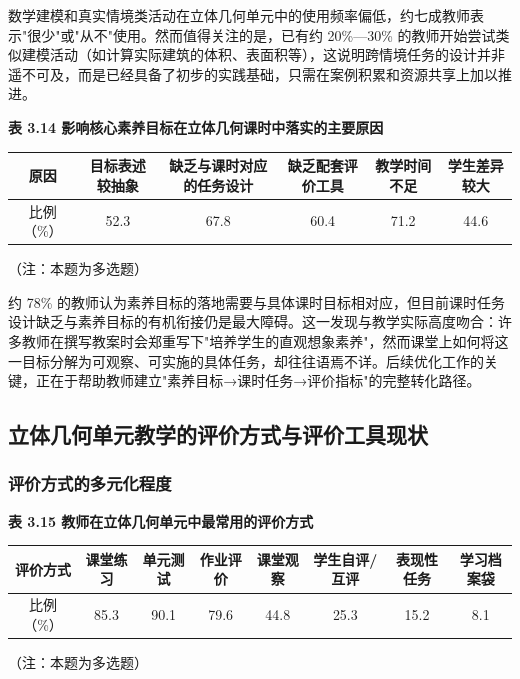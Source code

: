 \documentclass[UTF8,a4paper,12pt,twoside]{ctexart}
\begin{document}
数学建模和真实情境类活动在立体几何单元中的使用频率偏低，约七成教师表示"很少"或"从不"使用。然而值得关注的是，已有约 20\%—30\% 的教师开始尝试类似建模活动（如计算实际建筑的体积、表面积等），这说明跨情境任务的设计并非遥不可及，而是已经具备了初步的实践基础，只需在案例积累和资源共享上加以推进。

\textbf{表 3.14 影响核心素养目标在立体几何课时中落实的主要原因}

\begin{center}
\begin{tabular}{|c|c|c|c|c|c|}
\hline
原因 & 目标表述较抽象 & 缺乏与课时对应的任务设计 & 缺乏配套评价工具 & 教学时间不足 & 学生差异较大 \\
\hline
比例（\%） & 52.3 & 67.8 & 60.4 & 71.2 & 44.6 \\
\hline
\end{tabular}
\end{center}

（注：本题为多选题）

约 78\% 的教师认为素养目标的落地需要与具体课时目标相对应，但目前课时任务设计缺乏与素养目标的有机衔接仍是最大障碍。这一发现与教学实际高度吻合：许多教师在撰写教案时会郑重写下"培养学生的直观想象素养"，然而课堂上如何将这一目标分解为可观察、可实施的具体任务，却往往语焉不详。后续优化工作的关键，正在于帮助教师建立"素养目标→课时任务→评价指标"的完整转化路径。

\subsection{立体几何单元教学的评价方式与评价工具现状}

\subsubsection{评价方式的多元化程度}

\textbf{表 3.15 教师在立体几何单元中最常用的评价方式}

\begin{center}
\begin{tabular}{|c|c|c|c|c|c|c|c|}
\hline
评价方式 & 课堂练习 & 单元测试 & 作业评价 & 课堂观察 & 学生自评/互评 & 表现性任务 & 学习档案袋 \\
\hline
比例（\%） & 85.3 & 90.1 & 79.6 & 44.8 & 25.3 & 15.2 & 8.1 \\
\hline
\end{tabular}
\end{center}

（注：本题为多选题）
\end{document}
